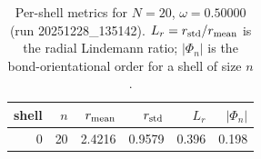 \begin{table}[t]
\centering
\small
\setlength{\tabcolsep}{4pt}
\renewcommand{\arraystretch}{1.15}
\begin{tabular}{r r r r r r}
\toprule
shell & $n$ & $r_{\rm mean}$ & $r_{\rm std}$ & $L_r$ & $|\Phi_n|$ \\
\midrule
0 & 20 & 2.4216 & 0.9579 & 0.396 & 0.198 \\
\bottomrule
\end{tabular}
\caption{Per-shell metrics for $N=20$, $\omega=0.50000$ (run 20251228_135142). $L_r=r_{\rm std}/r_{\rm mean}$ is the radial Lindemann ratio; $|\Phi_n|$ is the bond-orientational order for a shell of size $n$.}
\end{table}